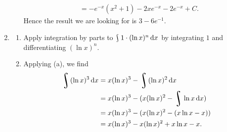 \begin{enumerate}
\begin{enumerate}
\begin{align*}
                                            &= -e^{-x}(x^2 + 1) - 2xe^{-x} -2e^{-x} + C.
            \end{align*}
            Hence the result we are looking for is $ 3 - 6e^{-1} $.
    \end{enumerate}
  \item
    \begin{enumerate}
      \item Apply integration by parts to $ \rint 1 \cdot (\ln x)^n \dif{x} $ by integrating $ 1 $ and differentiating $ (\ln x)^n $.
      \item Applying (a), we find
            \begin{align*}
              \rint (\ln x)^3 \dif{x} &= x(\ln x)^3 - \rint (\ln x)^{2} \dif{x}\\
                                      &= x(\ln x)^3 - (x(\ln x)^2 - \rint \ln x \dif{x})\\
                                      &= x(\ln x)^3 - (x(\ln x)^2 - (x\ln x - x))\\
                                      &= x(\ln x)^3 - x(\ln x)^2 + x\ln x - x.
            \end{align*}
    \end{enumerate}
\end{enumerate}

